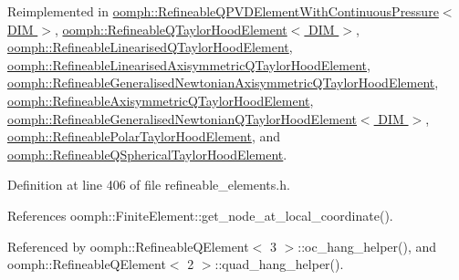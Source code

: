 Reimplemented in \hyperlink{classoomph_1_1RefineableQPVDElementWithContinuousPressure_ac2b58d140461e737e6e013ea26489e0c}{oomph\+::\+Refineable\+Q\+P\+V\+D\+Element\+With\+Continuous\+Pressure$<$ D\+I\+M $>$}, \hyperlink{classoomph_1_1RefineableQTaylorHoodElement_abc2fe9fc2b519cbe96d2be48fe092db0}{oomph\+::\+Refineable\+Q\+Taylor\+Hood\+Element$<$ D\+I\+M $>$}, \hyperlink{classoomph_1_1RefineableLinearisedQTaylorHoodElement_a3ca81c787638e7e8a66d123f7c52feb7}{oomph\+::\+Refineable\+Linearised\+Q\+Taylor\+Hood\+Element}, \hyperlink{classoomph_1_1RefineableLinearisedAxisymmetricQTaylorHoodElement_a198ab2e61e5ac1b79e46fcd4d3f29a3c}{oomph\+::\+Refineable\+Linearised\+Axisymmetric\+Q\+Taylor\+Hood\+Element}, \hyperlink{classoomph_1_1RefineableGeneralisedNewtonianAxisymmetricQTaylorHoodElement_ab219c5f46716ac3ea6582580f4398f93}{oomph\+::\+Refineable\+Generalised\+Newtonian\+Axisymmetric\+Q\+Taylor\+Hood\+Element}, \hyperlink{classoomph_1_1RefineableAxisymmetricQTaylorHoodElement_a812a3d6cf7355efa12fe27f46143e981}{oomph\+::\+Refineable\+Axisymmetric\+Q\+Taylor\+Hood\+Element}, \hyperlink{classoomph_1_1RefineableGeneralisedNewtonianQTaylorHoodElement_a0766216e91d89a8459e650b6b5a72f2c}{oomph\+::\+Refineable\+Generalised\+Newtonian\+Q\+Taylor\+Hood\+Element$<$ D\+I\+M $>$}, \hyperlink{classoomph_1_1RefineablePolarTaylorHoodElement_a2fe498d948d77e7bc89e68c787b4e539}{oomph\+::\+Refineable\+Polar\+Taylor\+Hood\+Element}, and \hyperlink{classoomph_1_1RefineableQSphericalTaylorHoodElement_a0308ea44ae80a2e6bbb2453ee12482a2}{oomph\+::\+Refineable\+Q\+Spherical\+Taylor\+Hood\+Element}.



Definition at line 406 of file refineable\+\_\+elements.\+h.



References oomph\+::\+Finite\+Element\+::get\+\_\+node\+\_\+at\+\_\+local\+\_\+coordinate().



Referenced by oomph\+::\+Refineable\+Q\+Element$<$ 3 $>$\+::oc\+\_\+hang\+\_\+helper(), and oomph\+::\+Refineable\+Q\+Element$<$ 2 $>$\+::quad\+\_\+hang\+\_\+helper().

\mbox{\label{classoomph_1_1RefineableElement_acad7a1ad82b7d818ddbec4200b339ade}} 

